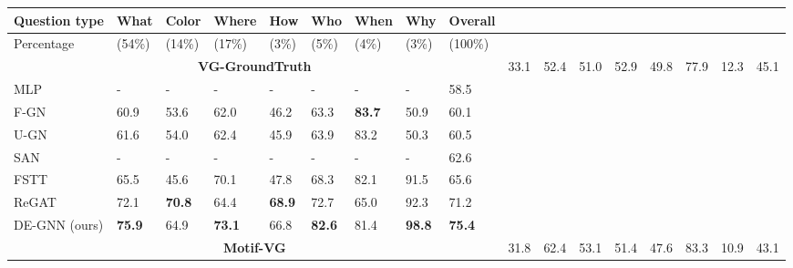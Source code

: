 \documentclass[letterpaper]{article} %
\begin{document}

\begin{table}[ht]
\centering
    \begin{tabular}{l|lllllllll}
    \hline
    \textbf{Question type}&\textbf{What}&\textbf{Color}&\textbf{Where}&\textbf{How}&\textbf{Who}&\textbf{When}&\textbf{Why}&\textbf{Overall}\\
    \hline
     Percentage &(54\%) &(14\%) &(17\%) &(3\%) &(5\%) &(4\%) &(3\%) &(100\%)\\
    \hline
    \multicolumn{9}{c}{\bf VG-GroundTruth} \cr\hline %
     NSM~\cite{DBLP:conf/nips/HudsonM19} &33.1 &52.4 &51.0 &52.9 &49.8 &77.9 &12.3 &45.1\\
     MLP~\cite{DBLP:conf/eccv/JabriJM16} &- &- &- &- &- &- &- &58.5\\
     F-GN~\cite{DBLP:conf/bmvc/ZhangCX19}&60.9 &53.6 &62.0 &46.2 &63.3 &\textbf{83.7} &50.9 &60.1\\
     U-GN~\cite{DBLP:conf/bmvc/ZhangCX19}&61.6 &54.0 &62.4 &45.9 &63.9 & 83.2 &50.3 &60.5\\
     SAN~\cite{DBLP:conf/cvpr/FanZ18} &- &- &- &- &- &- &- &62.6\\
     FSTT~\cite{inproceedings} &65.5 &45.6 &70.1 &47.8 &68.3 &82.1 &91.5 &65.6\\
     ReGAT~\cite{DBLP:conf/iccv/LiGCL19} &72.1 &\textbf{70.8} &64.4 &\textbf{68.9} &72.7 &65.0 &92.3 &71.2\\
     DE-GNN (ours) &\textbf{75.9} &64.9 &\textbf{73.1} &66.8 &\textbf{82.6} &81.4 &\textbf{98.8} &\textbf{75.4}\\
    \hline
     \multicolumn{9}{c}{\bf Motif-VG} \cr\hline
     NSM~\cite{DBLP:conf/nips/HudsonM19} &31.8 &62.4 &53.1 &51.4 &47.6 &83.3 &10.9 &43.1\\

\end{tabular}
\end{table}
\end{document}
